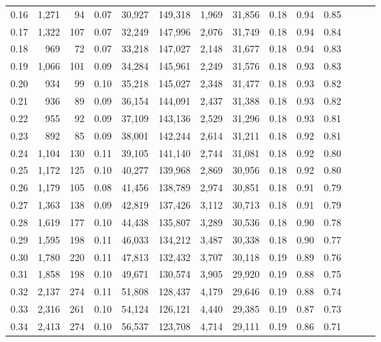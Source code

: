 \begin{tabular}{rrrrrrrrrrrrrr}
0.16 &  1,271 &   94 &  0.07 &   30,927 &  149,318 &   1,969 &  31,856 &  0.18 &  0.94 &      0.85 \\
0.17 &  1,322 &  107 &  0.07 &   32,249 &  147,996 &   2,076 &  31,749 &  0.18 &  0.94 &      0.84 \\
0.18 &    969 &   72 &  0.07 &   33,218 &  147,027 &   2,148 &  31,677 &  0.18 &  0.94 &      0.83 \\
0.19 &  1,066 &  101 &  0.09 &   34,284 &  145,961 &   2,249 &  31,576 &  0.18 &  0.93 &      0.83 \\
0.20 &    934 &   99 &  0.10 &   35,218 &  145,027 &   2,348 &  31,477 &  0.18 &  0.93 &      0.82 \\
0.21 &    936 &   89 &  0.09 &   36,154 &  144,091 &   2,437 &  31,388 &  0.18 &  0.93 &      0.82 \\
0.22 &    955 &   92 &  0.09 &   37,109 &  143,136 &   2,529 &  31,296 &  0.18 &  0.93 &      0.81 \\
0.23 &    892 &   85 &  0.09 &   38,001 &  142,244 &   2,614 &  31,211 &  0.18 &  0.92 &      0.81 \\
0.24 &  1,104 &  130 &  0.11 &   39,105 &  141,140 &   2,744 &  31,081 &  0.18 &  0.92 &      0.80 \\
0.25 &  1,172 &  125 &  0.10 &   40,277 &  139,968 &   2,869 &  30,956 &  0.18 &  0.92 &      0.80 \\
0.26 &  1,179 &  105 &  0.08 &   41,456 &  138,789 &   2,974 &  30,851 &  0.18 &  0.91 &      0.79 \\
0.27 &  1,363 &  138 &  0.09 &   42,819 &  137,426 &   3,112 &  30,713 &  0.18 &  0.91 &      0.79 \\
0.28 &  1,619 &  177 &  0.10 &   44,438 &  135,807 &   3,289 &  30,536 &  0.18 &  0.90 &      0.78 \\
0.29 &  1,595 &  198 &  0.11 &   46,033 &  134,212 &   3,487 &  30,338 &  0.18 &  0.90 &      0.77 \\
0.30 &  1,780 &  220 &  0.11 &   47,813 &  132,432 &   3,707 &  30,118 &  0.19 &  0.89 &      0.76 \\
0.31 &  1,858 &  198 &  0.10 &   49,671 &  130,574 &   3,905 &  29,920 &  0.19 &  0.88 &      0.75 \\
0.32 &  2,137 &  274 &  0.11 &   51,808 &  128,437 &   4,179 &  29,646 &  0.19 &  0.88 &      0.74 \\
0.33 &  2,316 &  261 &  0.10 &   54,124 &  126,121 &   4,440 &  29,385 &  0.19 &  0.87 &      0.73 \\
0.34 &  2,413 &  274 &  0.10 &   56,537 &  123,708 &   4,714 &  29,111 &  0.19 &  0.86 &      0.71 \\

\end{tabular}
